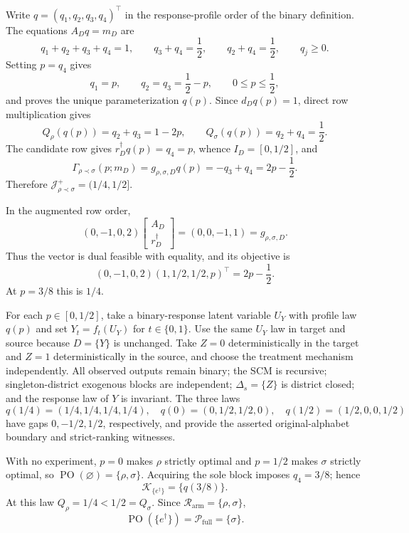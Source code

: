 Write \(q=(q_1,q_2,q_3,q_4)^\top\) in the response-profile order of the binary definition.  The equations \(A_Dq=m_D\) are
\[
q_1+q_2+q_3+q_4=1,
\qquad q_3+q_4=\frac12,
\qquad q_2+q_4=\frac12,
\qquad q_j\geq0.
\]
Setting \(p=q_4\) gives
\[
q_1=p,
\qquad q_2=q_3=\frac12-p,
\qquad 0\leq p\leq\frac12,
\]
and proves the unique parameterization \(q(p)\).  Since \(d_Dq(p)=1\), direct row multiplication gives
\[
Q_\rho(q(p))=q_2+q_3=1-2p,
\qquad
Q_\sigma(q(p))=q_2+q_4=\frac12.
\]
The candidate row gives \(r_D^\dagger q(p)=q_4=p\), whence \(I_D=[0,1/2]\), and
\[
\Gamma_{\rho\prec\sigma}(p;m_D)
=g_{\rho,\sigma,D}q(p)
=-q_3+q_4=2p-\frac12.
\]
Therefore \(\mathcal J_{\rho\prec\sigma}^+=(1/4,1/2]\).

In the augmented row order,
\[
(0,-1,0,2)
\begin{bmatrix}A_D\\ r_D^\dagger\end{bmatrix}
=(0,0,-1,1)=g_{\rho,\sigma,D}.
\]
Thus the vector is dual feasible with equality, and its objective is
\[
(0,-1,0,2)(1,1/2,1/2,p)^\top=2p-\frac12.
\]
At \(p=3/8\) this is \(1/4\).

For each \(p\in[0,1/2]\), take a binary-response latent variable \(U_Y\) with profile law \(q(p)\) and set \(Y_t=f_t(U_Y)\) for \(t\in\{0,1\}\).  Use the same \(U_Y\) law in target and source because \(D=\{Y\}\) is unchanged.  Take \(Z=0\) deterministically in the target and \(Z=1\) deterministically in the source, and choose the treatment mechanism independently.  All observed outputs remain binary; the SCM is recursive; singleton-district exogenous blocks are independent; \(\Delta_s=\{Z\}\) is district closed; and the response law of \(Y\) is invariant.  The three laws
\[
q(1/4)=(1/4,1/4,1/4,1/4),
\quad q(0)=(0,1/2,1/2,0),
\quad q(1/2)=(1/2,0,0,1/2)
\]
have gaps \(0,-1/2,1/2\), respectively, and provide the asserted original-alphabet boundary and strict-ranking witnesses.

With no experiment, \(p=0\) makes \(\rho\) strictly optimal and \(p=1/2\) makes \(\sigma\) strictly optimal, so \(\operatorname{PO}(\varnothing)=\{\rho,\sigma\}\).  Acquiring the sole block imposes \(q_4=3/8\); hence
\[
\mathcal K_{\{e^\dagger\}}=\{q(3/8)\}.
\]
At this law \(Q_\rho=1/4<1/2=Q_\sigma\).  Since \(\mathcal R_{\mathrm{arm}}=\{\rho,\sigma\}\),
\[
\operatorname{PO}(\{e^\dagger\})=\mathcal P_{\mathrm{full}}=\{\sigma\}.
\]